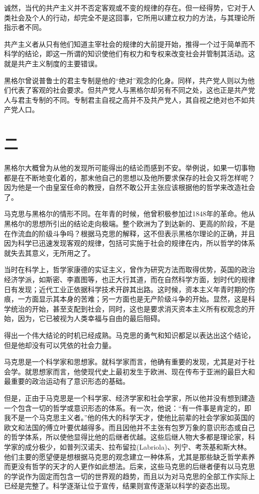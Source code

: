 \documentclass[12pt,oneside]{book}
\begin{document}
\begin{common-format}
诚然，当代的共产主义并不否定客观或不变的规律的存在。但一经得势，它对于人类社会及个人的行动，却完全不是这回事，它所用以建立权力的方法，与其理论所指示者不同。

共产主义者从只有他们知道主宰社会的规律的大前提开始，推得一个过于简单而不科学的结论，即这一所谓的知识使他们有权力和专权来改变社会并管制其活动。这就是共产主义制度的主要错误。

黑格尔曾说普鲁士的君主专制是他的“绝对”观念的化身。同样，共产党人则以为他们代表了客观的社会要求。但共产党人与黑格尔却另有不同之处，这也正是共产党人与君主专制的不同。专制君主自视之高并不及共产党人，其自视之绝对也不如共产党人口。

\section{二}
黑格尔大概曾为从他的发现所可能得出的结论而感到不安。举例说，如果一切事物都是在不断地变化着的，那末他自己的思想以及他所要求保存的社会又将怎样呢？因为他是一个由皇室任命的教授，自然不敢公开主张应该根据他的哲学来改造社会了。

马克思与黑格尔的情形不同。在年青的时候，他曾积极参加过1848年的革命。他从黑格尔的思想所引出的结论走向极端。整个欧洲为了到达新的、更高的阶段，不是在作流血的阶级斗争吗？根据马克思的解释，这不但表示黑格尔理论的正确，并且因为科学已迅速发现客观的规律，包括可实施于社会的规律在内，所以哲学的体系就失去其意义，无所用之了。

当时在科学上，哲学家康德的实证主义，曾作为研究方法而取得优势，英国的政治经济学派，如斯密、李嘉图等，也正大行其道，而在自然科学方面，划时代的规律日有发现；近代工业正依据科学技术开辟其出路。这时候，资本主义年青时期的伤痕，一方面显示其本身的苦难；另一方面也是无产阶级斗争的开始。显然，这是科学统治的开始，甚至支配到社会，同时，这也是要求消灭资本主义所有权观念的开始，因为，它已被视为人类幸福与自由的最后阻碍。

得出一个伟大结论的时机已经成熟。马克思的勇气和知识都足以表达出这个结论，但是他却没有可以凭依的社会力量。

马克思是一个科学家和思想家。就科学家而言，他确有重要的发现，尤其是对于社会学。就思想家而言，他使现代史上最初发生于欧洲、现在传布于亚洲的最巨大和最重要的政治运动有了意识形态的基础。

但是，正由于马克思是一个科学家、经济学家和社会学家，所以他并没有想到建造一个包含一切的哲学或意识形态的体系。有一次，他说：“有一件事是肯定的，即我不是一个马克思主义者。”他的伟大的科学天才，使他比前辈的社会学家如英国的欧文和法国的傅立叶要优越得多。而且因他并不主张有包罗万象的意识形态或自己的哲学体系，所以使他显得比他的后继者优越。这些后继人物大多都是理论家，科学家的成分极少，如普列汉诺夫、拉布留拉(Labriola)、列宁、考茨基和斯大林。他们主要的愿望便是想根据马克思的观念建立一种体系，尤其是那些缺乏哲学素养而更没有哲学的天才的人更作如此想法。后来，这些马克思的后继者便有以马克思的学说作为固定而包含一切的世界观的趋势，而且以为对马克思的全部工作实际上已经是完整了。科学逐渐让位于宣传，结果则宣传逐渐以科学的姿态出现。


\end{common-format}
\end{document}
